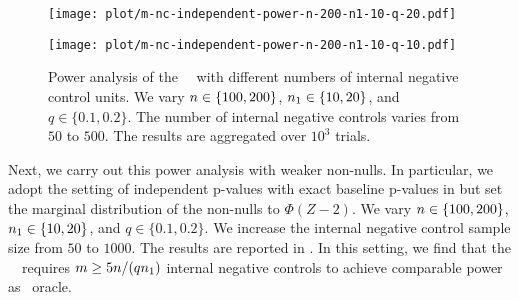 \begin{figure}[tbp]
\begin{minipage}{6.7cm}
    \end{minipage}
    \begin{minipage}{6.7cm}
    \centering
\texttt{[image: plot/m-nc-independent-power-n-200-n1-10-q-20.pdf]}
\end{minipage}
    \begin{minipage}{6.7cm}
    \centering
\texttt{[image: plot/m-nc-independent-power-n-200-n1-10-q-10.pdf]}
\end{minipage}
    \caption{{Power analysis of the \BH~\nickname~with different numbers of internal negative control units. We vary ${n} \in \{100, 200\}$, ${n_1}  \in \{10, 20\}$, and $q \in \{0.1, 0.2\}$. The number of internal negative controls varies from $50$ to $500$. The results are aggregated over $10^3$ trials. }}
    \label{fig:nc.sample.size}
  \end{figure}

Next, we carry out this power analysis with weaker non-nulls.
In particular, we adopt the setting of independent p-values with exact
baseline p-values in  but set the marginal
distribution of the non-nulls to $\Phi(Z - 2)$. We vary ${n} \in
\{100, 200\}$, ${n_1}  \in \{10, 20\}$, and $q \in \{0.1,
0.2\}$. We increase the internal negative control sample size from
$50$ to $1000$. The results are reported in
. In this setting, we find
that the \BH~\nickname~requires $m \ge
5 {n}/(q {n_1})$ internal negative controls to achieve
comparable power as \BH~oracle.

